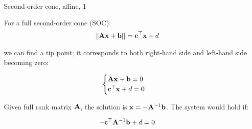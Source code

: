 \documentclass{beamer}
\begin{document}
\begin{frame}{Second-order cone, affine, 1}
	\begin{flushleft}
		
		For a full second-order cone (SOC):
		\begin{equation}
			||\mathbf{A}\mathbf{x}+\mathbf{b}|| = \mathbf{c}^\top \mathbf{x} + d
		\end{equation}
	
		we can find a tip point; it corresponds to both right-hand side and left-hand side becoming zero:
		
		\begin{equation}
			\begin{cases}
				\mathbf{A}\mathbf{x}+\mathbf{b} = 0 \\
				\mathbf{c}^\top \mathbf{x} + d = 0
			\end{cases}
		\end{equation}
		
		Given full rank matrix $\mathbf{A}$, the solution is $\mathbf{x} = -\mathbf{A}^{-1}\mathbf{b}$. The system would hold if:
		
		\begin{equation}
			-\mathbf{c}^\top \mathbf{A}^{-1}\mathbf{b} + d = 0
		\end{equation}
		
		
	\end{flushleft}
\end{frame}
\end{document}
